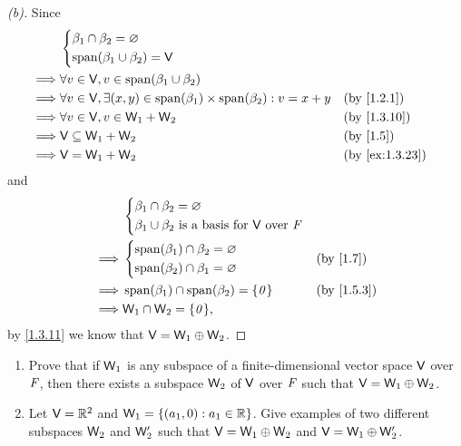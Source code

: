 \begin{proof}[(b)]
	Since
	\begin{align*}
		         & \begin{dcases}
			           \beta_1 \cap \beta_2 = \varnothing \\
			           \spn{\beta_1 \cup \beta_2} = \V
		           \end{dcases}                                                                      \\
		\implies & \forall v \in \V, v \in \spn{\beta_1 \cup \beta_2}                                                      \\
		\implies & \forall v \in \V, \exists (x, y) \in \spn{\beta_1} \times \spn{\beta_2} : v = x + y &  & \by{1.2.1}     \\
		\implies & \forall v \in \V, v \in \W_1 + \W_2                                                 &  & \by{1.3.10}    \\
		\implies & \V \subseteq \W_1 + \W_2                                                            &  & \by{1.5}       \\
		\implies & \V = \W_1 + \W_2                                                                    &  & \by{ex:1.3.23}
	\end{align*}
	and
	\begin{align*}
		         & \begin{dcases}
			           \beta_1 \cap \beta_2 = \varnothing \\
			           \beta_1 \cup \beta_2 \text{ is a basis for } \V \text{ over } \F
		           \end{dcases}                  \\
		\implies & \begin{dcases}
			           \spn{\beta_1} \cap \beta_2 = \varnothing \\
			           \spn{\beta_2} \cap \beta_1 = \varnothing
		           \end{dcases}                      &  & \by{1.7}                                  \\
		\implies & \spn{\beta_1} \cap \spn{\beta_2} = \set{\zv}                     &  & \by{1.5.3} \\
		\implies & \W_1 \cap \W_2 = \set{\zv},
	\end{align*}
	by \cref{1.3.11} we know that \(\mathsf{V} = \mathsf{W}_1 \oplus \mathsf{W}_2\).
\end{proof}

\begin{ex}\label{ex:1.6.34}
	\quad
	\begin{enumerate}
		\item Prove that if \(\mathsf{W}_1\) is any subspace of a finite-dimensional vector space \(\mathsf{V}\) over \(\mathit{F}\), then there exists a subspace \(\mathsf{W}_2\) of \(\mathsf{V}\) over \(\mathit{F}\) such that \(\mathsf{V} = \mathsf{W}_1 \oplus \mathsf{W}_2\).
		\item Let \(\mathsf{V} = \mathbb{R}^2\) and \(\mathsf{W}_1 = \left\lbrace(a_1, 0) : a_1 \in \mathbb{R}\right\rbrace\).
		      Give examples of two different subspaces \(\mathsf{W}_2\) and \(\mathsf{W}_2'\) such that \(\mathsf{V} = \mathsf{W}_1 \oplus \mathsf{W}_2\) and \(\mathsf{V} = \mathsf{W}_1 \oplus \mathsf{W}_2'\).
	\end{enumerate}
\end{ex}

